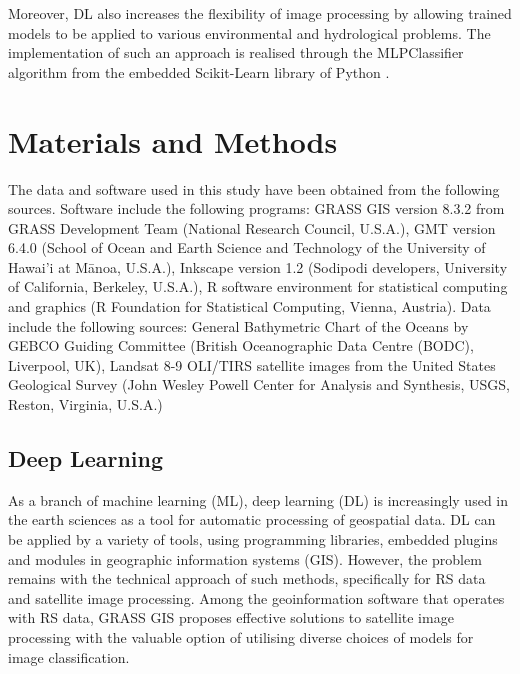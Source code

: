 \documentclass[water,article,accept,pdftex,oneauhor]{Definitions/mdpi}
\begin{document}
Moreover, DL{ }also increases{ the }flexibility of{ }image processing by allowing trained models{ }to be applied to various environmental {and hydrological }problems. The implementation of {such} an approach is realised through the MLPClassifier algorithm from the embedded Scikit-Learn library of Python \cite{pedregosa2011scikit,van1995python}. 

\section{Materials and Methods}
The data and software used in this study have been obtained from the following sources. Software include the following programs: GRASS GIS version 8.3.2 from GRASS Development Team (National Research Council, U.S.A.), GMT version 6.4.0 (School of Ocean and Earth Science and Technology of the University of Hawai'i at Mānoa, U.S.A.), Inkscape version 1.2 (Sodipodi developers, University of California, Berkeley, U.S.A.), R software environment for statistical computing and graphics (R Foundation for Statistical Computing, Vienna, Austria). Data include the following sources: General Bathymetric Chart of the Oceans by GEBCO Guiding Committee (British Oceanographic Data Centre (BODC), Liverpool, UK), Landsat 8-9 OLI/TIRS satellite images from the United States Geological Survey (John Wesley Powell Center for Analysis and Synthesis, USGS, Reston, Virginia, U.S.A.)

\subsection{Deep Learning}

As a branch of machine learning (ML), deep learning (DL) is increasingly used in {the }earth {sciences as a tool} for automatic processing of geospatial data. DL can be applied by a variety of tools, using programming libraries, embedded plugins and modules in geographic information systems (GIS). {However, the} problem remains with the technical approach of such methods, {specifically for RS data and satellite image processing}. Among the geoinformation software {that operates with RS data}, GRASS GIS \cite{GRASS_GIS_software,NETELER2012124,MitasovaNeteler} proposes effective solutions to satellite image processing with the {valuable }option {of utilising} diverse choices of models for image classification.
\end{document}
